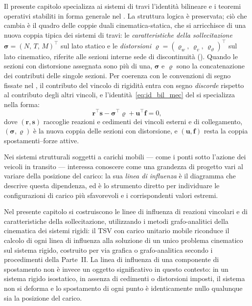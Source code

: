 Il presente capitolo specializza ai sistemi di travi
l'identità bilineare e i teoremi operativi stabiliti in
forma generale nel . La struttura logica è
preservata; ciò che cambia è il quadro delle coppie duali
cinematica-statica, che si arricchisce di una nuova coppia
tipica dei sistemi di travi: le \emph{caratteristiche della
	sollecitazione} $\bm{\sigma} = (N,\, T,\, M)^\top$ sul lato
statico e le \emph{distorsioni} $\bm{\varrho} = (\varrho_w,\,
\varrho_v,\, \varrho_\vartheta)^\top$ sul lato cinematico,
riferite alle sezioni interne sede di discontinuità
(). Quando le sezioni con distorsione
assegnata sono più di una, $\bm{\sigma}$ e $\bm{\varrho}$ sono
la concatenazione dei contributi delle singole sezioni. Per
coerenza con le convenzioni di segno fissate nel
, il contributo del vincolo di
rigidità entra con segno \emph{discorde} rispetto al
contributo degli altri vincoli, e l'identità~\eqref{eq:id_bil_mec}
del  si specializza nella forma:
\begin{equation}\label{eq:id_bil_travi}
	\bm{r}^\top\bm{s} - \bm{\sigma}^\top\bm{\varrho} +
	\bm{u}^\top\bm{f} = 0,
\end{equation}
dove $(\bm{r},\bm{s})$ raccoglie reazioni e cedimenti dei
vincoli esterni e di collegamento, $(\bm{\sigma},
\bm{\varrho})$ è la nuova coppia delle sezioni con
distorsione, e $(\bm{u},\bm{f})$ resta la coppia
spostamenti--forze attive.

Nei sistemi strutturali soggetti a carichi mobili --- come
i ponti sotto l'azione dei veicoli in transito --- interessa
conoscere come una grandezza di progetto vari al variare
della posizione del carico: la sua \emph{linea di influenza}
è il diagramma che descrive questa dipendenza, ed è lo
strumento diretto per individuare le configurazioni di
carico più sfavorevoli e i corrispondenti valori estremi.

Nel presente capitolo si costruiscono le linee di influenza
di reazioni vincolari e di caratteristiche della
sollecitazione, utilizzando i metodi grafo-analitici della
cinematica dei sistemi rigidi: il TSV con carico unitario
mobile riconduce il calcolo di ogni linea di influenza alla
soluzione di un unico problema cinematico sul sistema
rigido, costruito per via grafica o grafo-analitica secondo
i procedimenti della Parte~II. La linea di influenza di una
componente di spostamento non è invece un oggetto
significativo in questo contesto: in un sistema rigido
isostatico, in assenza di cedimenti o distorsioni imposti,
il sistema non si deforma e lo spostamento di ogni punto è
identicamente nullo qualunque sia la posizione del carico.




